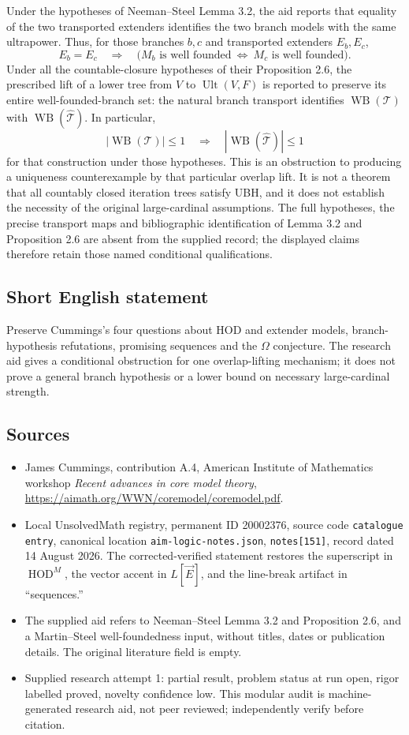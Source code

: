 \documentclass[11pt]{article}
\begin{document}
Under the hypotheses of Neeman--Steel Lemma 3.2, the aid reports that equality of the two transported extenders identifies the two branch models with the same ultrapower. Thus, for those branches $b,c$ and transported extenders $E_b,E_c$,
\[
 E_b=E_c\quad\Longrightarrow\quad
 \bigl(M_b\text{ is well founded}\ \Longleftrightarrow\
       M_c\text{ is well founded}\bigr).
\]
Under all the countable-closure hypotheses of their Proposition 2.6, the prescribed lift of a lower tree from $V$ to $\operatorname{Ult}(V,F)$ is reported to preserve its entire well-founded-branch set: the natural branch transport identifies $\operatorname{WB}(\mathcal T)$ with $\operatorname{WB}(\widehat{\mathcal T})$. In particular,
\[
 |\operatorname{WB}(\mathcal T)|\le1
 \quad\Longrightarrow\quad
 |\operatorname{WB}(\widehat{\mathcal T})|\le1
\]
for that construction under those hypotheses. This is an obstruction to producing a uniqueness counterexample by that particular overlap lift. It is not a theorem that all countably closed iteration trees satisfy UBH, and it does not establish the necessity of the original large-cardinal assumptions. The full hypotheses, the precise transport maps and bibliographic identification of Lemma 3.2 and Proposition 2.6 are absent from the supplied record; the displayed claims therefore retain those named conditional qualifications.
\subsection{Short English statement}
Preserve Cummings's four questions about HOD and extender models, branch-hypothesis refutations, promising sequences and the $\Omega$ conjecture. The research aid gives a conditional obstruction for one overlap-lifting mechanism; it does not prove a general branch hypothesis or a lower bound on necessary large-cardinal strength.
\subsection{Sources}
\begin{itemize}
\item James Cummings, contribution A.4, American Institute of Mathematics workshop \emph{Recent advances in core model theory}, \url{https://aimath.org/WWN/coremodel/coremodel.pdf}.
\item Local UnsolvedMath registry, permanent ID 20002376, source code \texttt{catalogue entry}, canonical location \texttt{aim-logic-notes.json}, \texttt{notes[151]}, record dated 14 August 2026. The corrected-verified statement restores the superscript in $\operatorname{HOD}^M$, the vector accent in $L[\vec E]$, and the line-break artifact in ``sequences.''
\item The supplied aid refers to Neeman--Steel Lemma 3.2 and Proposition 2.6, and a Martin--Steel well-foundedness input, without titles, dates or publication details. The original literature field is empty.
\item Supplied research attempt 1: partial result, problem status at run open, rigor labelled proved, novelty confidence low. This modular audit is machine-generated research aid, not peer reviewed; independently verify before citation.
\end{itemize}
\end{document}

